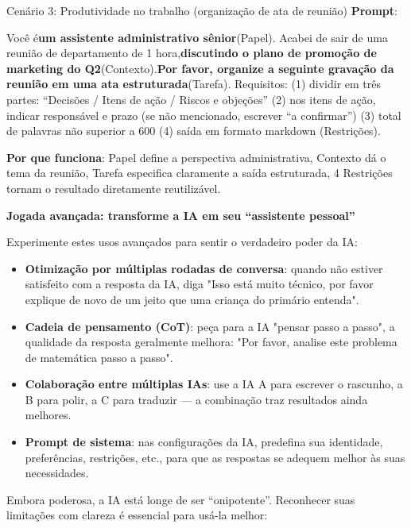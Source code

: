 \begin{tcbinfo}{Cenário 3: Produtividade no trabalho (organização de ata de reunião)}
\textbf{Prompt}:

Você é\textbf{um assistente administrativo sênior}(Papel). Acabei de sair de uma reunião de departamento de 1 hora,\textbf{discutindo o plano de promoção de marketing do Q2}(Contexto).\textbf{Por favor, organize a seguinte gravação da reunião em uma ata estruturada}(Tarefa). Requisitos: (1) dividir em três partes: “Decisões / Itens de ação / Riscos e objeções” (2) nos itens de ação, indicar responsável e prazo (se não mencionado, escrever “a confirmar”) (3) total de palavras não superior a 600 (4) saída em formato markdown (Restrições).

\textbf{Por que funciona}: Papel define a perspectiva administrativa, Contexto dá o tema da reunião, Tarefa especifica claramente a saída estruturada, 4 Restrições tornam o resultado diretamente reutilizável.

\end{tcbinfo}

\textbf{Jogada avançada: transforme a IA em seu “assistente pessoal”}\par

Experimente estes usos avançados para sentir o verdadeiro poder da IA:

\begin{itemize}
  \item \textbf{Otimização por múltiplas rodadas de conversa}: quando não estiver satisfeito com a resposta da IA, diga "Isso está muito técnico, por favor explique de novo de um jeito que uma criança do primário entenda".
  \item \textbf{Cadeia de pensamento (CoT)}: peça para a IA "pensar passo a passo", a qualidade da resposta geralmente melhora: "Por favor, analise este problema de matemática passo a passo".
  \item \textbf{Colaboração entre múltiplas IAs}: use a IA A para escrever o rascunho, a B para polir, a C para traduzir — a combinação traz resultados ainda melhores.
  \item \textbf{Prompt de sistema}: nas configurações da IA, predefina sua identidade, preferências, restrições, etc., para que as respostas se adequem melhor às suas necessidades.
\end{itemize}


Embora poderosa, a IA está longe de ser “onipotente”. Reconhecer suas limitações com clareza é essencial para usá-la melhor:

